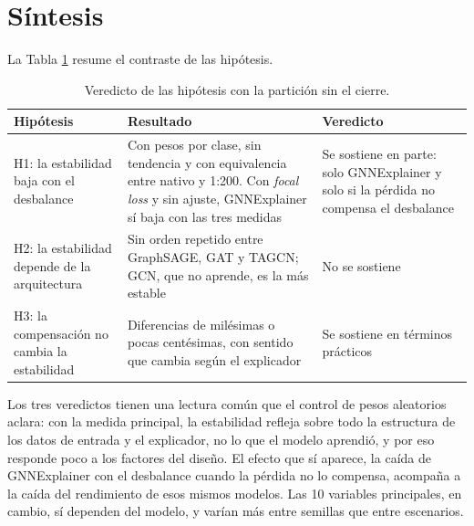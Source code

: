 \section{Síntesis}\label{sec:res_sintesis}

La Tabla \ref{tab:veredictos} resume el contraste de las hipótesis.

\begin{table}[ht]
\centering
\caption{Veredicto de las hipótesis con la partición sin el cierre.}
\label{tab:veredictos}
\small
\begin{tabularx}{\textwidth}{p{}Xp{}}
\toprule
Hipótesis & Resultado & Veredicto \\
\midrule
H1: la estabilidad baja con el desbalance & Con pesos por clase, sin tendencia y con
equivalencia entre nativo y 1:200. Con \textit{focal loss} y sin ajuste, GNNExplainer sí baja
con las tres medidas & Se sostiene en parte: solo GNNExplainer y solo si la pérdida no compensa
el desbalance \\
H2: la estabilidad depende de la arquitectura & Sin orden repetido entre GraphSAGE, GAT y
TAGCN; GCN, que no aprende, es la más estable & No se sostiene \\
H3: la compensación no cambia la estabilidad & Diferencias de milésimas o pocas centésimas,
con sentido que cambia según el explicador & Se sostiene en términos prácticos \\
\bottomrule
\end{tabularx}
\end{table}

Los tres veredictos tienen una lectura común que el control de pesos aleatorios aclara: con la
medida principal, la estabilidad refleja sobre todo la estructura de los datos de entrada y el
explicador, no lo que el modelo aprendió, y por eso responde poco a los factores del diseño. El
efecto que sí aparece, la caída de GNNExplainer con el desbalance cuando la pérdida no lo
compensa, acompaña a la caída del rendimiento de esos mismos modelos.
Las 10 variables principales, en cambio, sí dependen del modelo, y varían más entre semillas
que entre escenarios.
